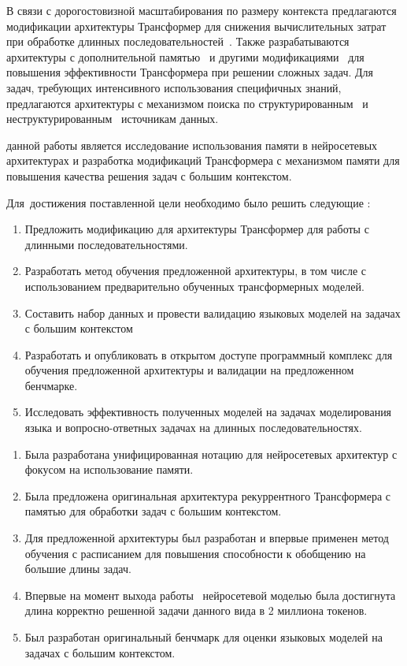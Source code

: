 В связи с дорогостовизной масштабирования по размеру контекста предлагаются модификации архитектуры Трансформер для снижения вычислительных затрат при обработке длинных последовательностей~\cite{katharopoulos2020transformers,dai2019transformerxl,beltagy2020longformer,zaheer2020big}. Также разрабатываются архитектуры с дополнительной памятью~\cite{burtsev2020memory-transformer} и другими модификациями~\cite{dehghani2018universal-transformer} для повышения эффективности Трансформера при решении сложных задач. Для задач, требующих интенсивного использования специфичных знаний, предлагаются архитектуры с механизмом поиска по структурированным~\cite{yu2022generate} и неструктурированным~\cite{wu2022memorizing} источникам данных.

{\aim} данной работы является исследование использования памяти в нейросетевых архитектурах и разработка модификаций Трансформера с механизмом памяти для повышения качества решения задач с большим контекстом.

Для~достижения поставленной цели необходимо было решить следующие {\tasks}:
\begin{enumerate}[beginpenalty=10000] %
    \item Предложить модификацию для архитектуры Трансформер для работы с длинными последовательностями.
    \item Разработать метод обучения предложенной архитектуры, в том числе с использованием предварительно обученных трансформерных моделей.
    \item Составить набор данных и провести валидацию языковых моделей на задачах с большим контекстом
    \item Разработать и опубликовать в открытом доступе программный комплекс для обучения предложенной архитектуры и валидации на предложенном бенчмарке.
    \item Исследовать эффективность полученных моделей на задачах моделирования языка и вопросно-ответных задачах на длинных последовательностях.
\end{enumerate}


{\novelty}
\begin{enumerate}[beginpenalty=10000] %
  \item Была разработана унифицированная нотацию для нейросетевых архитектур с фокусом на использование памяти.
  \item Была предложена оригинальная архитектура рекуррентного Трансформера с памятью для обработки задач с большим контекстом.
  \item Для предложенной архитектуры был разработан и впервые применен метод обучения с расписанием для повышения способности к обобщению на большие длины задач.
  \item Впервые на момент выхода работы~\cite{bulatov2023scaling} нейросетевой моделью была достигнута длина корректно решенной задачи данного вида в 2 миллиона токенов.
  \item Был разработан оригинальный бенчмарк для оценки языковых моделей на задачах с большим контекстом.
\end{enumerate}

